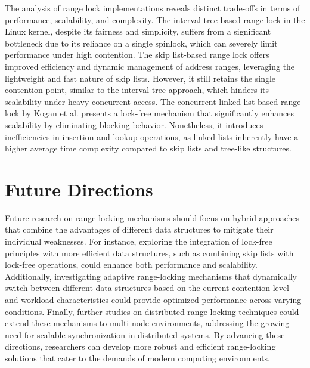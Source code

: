 The analysis of range lock implementations reveals distinct trade-offs in terms of performance, scalability, and complexity. 
The interval tree-based range lock in the Linux kernel, despite its fairness and simplicity, suffers from a significant bottleneck due to its reliance on a single spinlock, which can severely limit performance under high contention. 
The skip list-based range lock offers improved efficiency and dynamic management of address ranges, leveraging the lightweight and fast nature of skip lists. 
However, it still retains the single contention point, similar to the interval tree approach, which hinders its scalability under heavy concurrent access. 
The concurrent linked list-based range lock by Kogan et al. presents a lock-free mechanism that significantly enhances scalability by eliminating blocking behavior. 
Nonetheless, it introduces inefficiencies in insertion and lookup operations, as linked lists inherently have a higher average time complexity compared to skip lists and tree-like structures.

\section{Future Directions}

Future research on range-locking mechanisms should focus on hybrid approaches that combine the advantages of different data structures to mitigate their individual weaknesses. 
For instance, exploring the integration of lock-free principles with more efficient data structures, such as combining skip lists with lock-free operations, could enhance both performance and scalability. 
Additionally, investigating adaptive range-locking mechanisms that dynamically switch between different data structures based on the current contention level and workload characteristics could provide optimized performance across varying conditions. 
Finally, further studies on distributed range-locking techniques could extend these mechanisms to multi-node environments, addressing the growing need for scalable synchronization in distributed systems. 
By advancing these directions, researchers can develop more robust and efficient range-locking solutions that cater to the demands of modern computing environments.